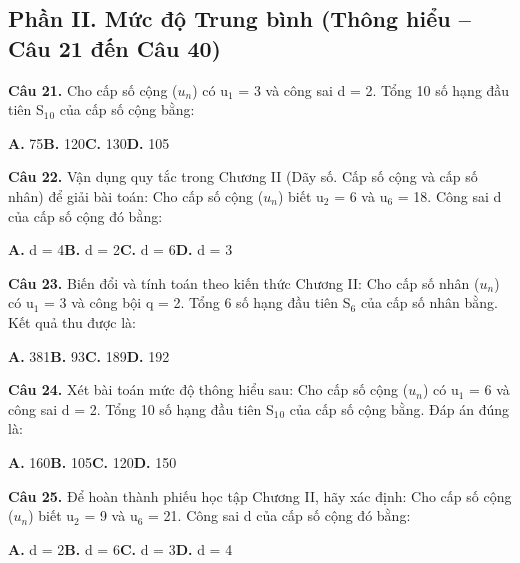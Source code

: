\documentclass[11pt,a4paper]{article}
\begin{document}
\subsection*{\color{accent} Phần II. Mức độ Trung bình (Thông hiểu -- Câu 21 đến Câu 40)}
\textbf{\color{primary} Câu 21.} Cho cấp số cộng ($u_n$) có u$_1$ = 3 và công sai d = 2. Tổng 10 số hạng đầu tiên S$_1$$_0$ của cấp số cộng bằng:\par
\hspace*{1.5em}\textbf{A.} 75\quad\quad \textbf{B.} 120\quad\quad \textbf{C.} 130\quad\quad \textbf{D.} 105\par\vspace{2pt}
\textbf{\color{primary} Câu 22.} Vận dụng quy tắc trong Chương II (Dãy số. Cấp số cộng và cấp số nhân) để giải bài toán: Cho cấp số cộng ($u_n$) biết u$_2$ = 6 và u$_6$ = 18. Công sai d của cấp số cộng đó bằng:\par
\hspace*{1.5em}\textbf{A.} d = 4\quad\quad \textbf{B.} d = 2\quad\quad \textbf{C.} d = 6\quad\quad \textbf{D.} d = 3\par\vspace{2pt}
\textbf{\color{primary} Câu 23.} Biến đổi và tính toán theo kiến thức Chương II: Cho cấp số nhân ($u_n$) có u$_1$ = 3 và công bội q = 2. Tổng 6 số hạng đầu tiên S$_6$ của cấp số nhân bằng. Kết quả thu được là:\par
\hspace*{1.5em}\textbf{A.} 381\quad\quad \textbf{B.} 93\quad\quad \textbf{C.} 189\quad\quad \textbf{D.} 192\par\vspace{2pt}
\textbf{\color{primary} Câu 24.} Xét bài toán mức độ thông hiểu sau: Cho cấp số cộng ($u_n$) có u$_1$ = 6 và công sai d = 2. Tổng 10 số hạng đầu tiên S$_1$$_0$ của cấp số cộng bằng. Đáp án đúng là:\par
\hspace*{1.5em}\textbf{A.} 160\quad\quad \textbf{B.} 105\quad\quad \textbf{C.} 120\quad\quad \textbf{D.} 150\par\vspace{2pt}
\textbf{\color{primary} Câu 25.} Để hoàn thành phiếu học tập Chương II, hãy xác định: Cho cấp số cộng ($u_n$) biết u$_2$ = 9 và u$_6$ = 21. Công sai d của cấp số cộng đó bằng:\par
\hspace*{1.5em}\textbf{A.} d = 2\quad\quad \textbf{B.} d = 6\quad\quad \textbf{C.} d = 3\quad\quad \textbf{D.} d = 4\par\vspace{2pt}
\end{document}
